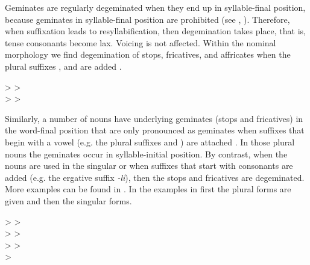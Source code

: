 Geminates are regularly degeminated when they end up in syllable-final position, because geminates in syllable-final position are prohibited (see , ). Therefore, when suffixation leads to resyllabification, then degemination takes place, that is, tense consonants become lax. Voicing is not affected. Within the nominal morphology we find degemination of stops, fricatives, and affricates when the plural suffixes ,  and  are added .
%
\begin{exe}
	\ex	\label{ex:degemination be ne me phon}
\TabPositions{14em} 
		 >  	\tab 	{} >   \\
		 >  		\tab 	{} >  
\end{exe}

Similarly, a number of nouns have underlying geminates (stops and fricatives) in the word-final position that are only pronounced as geminates when suffixes that begin with a vowel (e.g. the plural suffixes  and ) are attached  . In those plural nouns the geminates occur in syllable-initial position. By contrast, when the nouns are used in the singular or when suffixes that start with consonants are added (e.g. the ergative suffix \textit{-li}), then the stops and fricatives are degeminated. More examples can be found in . In the examples in  first the plural forms are given and then the singular forms.
  
%
\begin{exe}
	\ex	\label{ex:gemination e upee phon}
\TabPositions{13em} 
		  >  	\tab 		{} >   \\
		 >  	\tab 		{} >   \\
		 >   	\tab 		{} >   \\
		 >   
\end{exe}



